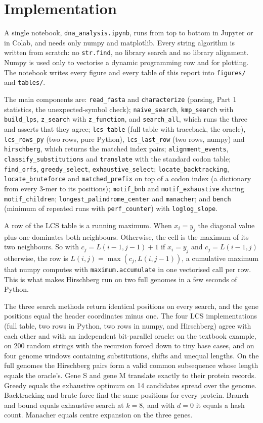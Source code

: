 \section{Implementation}\label{sec:implementation}

A single notebook, \texttt{dna\_analysis.ipynb}, runs from top to bottom in
Jupyter or in Colab, and needs only numpy and matplotlib. Every string algorithm is written from
scratch: no \texttt{str.find}, no library search and no library alignment. Numpy is used only to
vectorise a dynamic programming row and for plotting. The notebook writes every figure and every
table of this report into \texttt{figures/} and \texttt{tables/}.

The main components are: \texttt{read\_fasta} and \texttt{characterize} (parsing, Part 1 statistics, the unexpected-symbol check); \texttt{naive\_search}, \texttt{kmp\_search} with \texttt{build\_lps}, \texttt{z\_search} with \texttt{z\_function}, and \texttt{search\_all}, which runs the three and asserts that they agree; \texttt{lcs\_table} (full table with traceback, the oracle), \texttt{lcs\_rows\_py} (two rows, pure Python), \texttt{lcs\_last\_row} (two rows, numpy) and \texttt{hirschberg}, which returns the matched index pairs; \texttt{alignment\_events}, \texttt{classify\_substitutions} and \texttt{translate} with the standard codon table; \texttt{find\_orfs}, \texttt{greedy\_select}, \texttt{exhaustive\_select}; \texttt{locate\_backtracking}, \texttt{locate\_bruteforce} and \texttt{matched\_prefix} on top of a codon index (a dictionary from every 3-mer to its positions); \texttt{motif\_bnb} and \texttt{motif\_exhaustive} sharing \texttt{motif\_children}; \texttt{longest\_palindrome\_center} and \texttt{manacher}; and \texttt{bench} (minimum of repeated runs with \texttt{perf\_counter}) with \texttt{loglog\_slope}.

A row of the LCS table is a running maximum. When $x_i = y_j$ the diagonal value plus one dominates
both neighbours. Otherwise, the cell is the maximum of its two neighbours. So with
$c_j = L(i-1, j-1) + 1$ if $x_i = y_j$ and $c_j = L(i-1, j)$ otherwise, the row is
$L(i, j) = \max(c_j, L(i, j-1))$, a cumulative maximum that numpy computes with
\texttt{maximum.accumulate} in one vectorised call per row. This is what makes Hirschberg run on two
full genomes in a few seconds of Python.


The three search methods
return identical positions on every search, and the gene positions equal the header coordinates minus
one. The four LCS implementations (full table, two rows in Python, two rows in numpy, and Hirschberg)
agree with each other and with an independent bit-parallel oracle: on the textbook example, on 200
random strings with the recursion forced down to tiny base cases, and on four genome windows
containing substitutions, shifts and unequal lengths. On the full genomes the Hirschberg pairs form a
valid common subsequence whose length equals the oracle's. Gene S and gene M translate exactly to
their protein records. Greedy equals the exhaustive optimum on 14 candidates spread over the genome.
Backtracking and brute force find the same positions for every protein. Branch and bound equals
exhaustive search at $k = 8$, and with $d = 0$ it equals a hash count. Manacher equals centre
expansion on the three genes.
